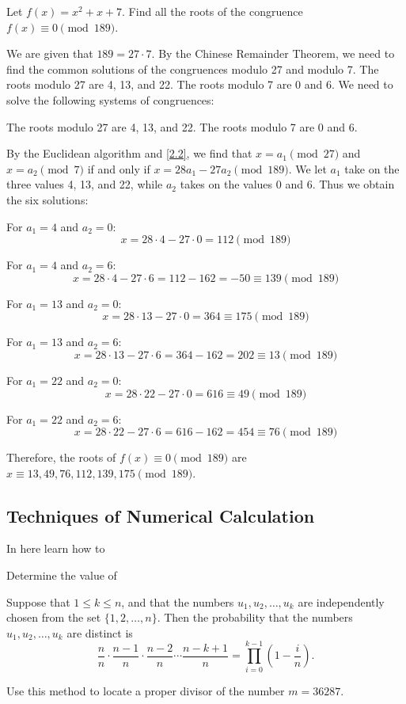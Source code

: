 \documentclass[11pt]{article}
\begin{document}
\begin{example}
	Let \( f(x) = x^2 + x + 7 \). Find all the roots of the congruence \( f(x) \equiv 0 \pmod{189} \).
\end{example}
\begin{solution}
	We are given that \(189 = 27 \cdot 7\). By the Chinese Remainder Theorem, we need to find the common solutions of the congruences modulo 27 and modulo 7. The roots modulo 27 are 4, 13, and 22. The roots modulo 7 are 0 and 6. We need to solve the following systems of congruences:

	The roots modulo 27 are 4, 13, and 22. The roots modulo 7 are 0 and 6.

	By the Euclidean algorithm and \cref{2.2}, we find that \(x = a_1 \pmod{27}\) and \(x = a_2 \pmod{7}\) if and only if \(x = 28a_1 - 27a_2 \pmod{189}\). We let \(a_1\) take on the three values 4, 13, and 22, while \(a_2\) takes on the values 0 and 6. Thus we obtain the six solutions:

	For \(a_1 = 4\) and \(a_2 = 0\):
	\[
		x = 28 \cdot 4 - 27 \cdot 0 = 112 \pmod{189}
	\]

	For \(a_1 = 4\) and \(a_2 = 6\):
	\[
		x = 28 \cdot 4 - 27 \cdot 6 = 112 - 162 = -50 \equiv 139 \pmod{189}
	\]

	For \(a_1 = 13\) and \(a_2 = 0\):
	\[
		x = 28 \cdot 13 - 27 \cdot 0 = 364 \equiv 175 \pmod{189}
	\]

	For \(a_1 = 13\) and \(a_2 = 6\):
	\[
		x = 28 \cdot 13 - 27 \cdot 6 = 364 - 162 = 202 \equiv 13 \pmod{189}
	\]

	For \(a_1 = 22\) and \(a_2 = 0\):
	\[
		x = 28 \cdot 22 - 27 \cdot 0 = 616 \equiv 49 \pmod{189}
	\]

	For \(a_1 = 22\) and \(a_2 = 6\):
	\[
		x = 28 \cdot 22 - 27 \cdot 6 = 616 - 162 = 454 \equiv 76 \pmod{189}
	\]

	Therefore, the roots of \(f(x) \equiv 0 \pmod{189}\) are \(x \equiv 13, 49, 76, 112, 139, 175 \pmod{189}\).
\end{solution}
\subsection{Techniques of Numerical Calculation}
In here learn how to
\begin{example}
	Determine the value of
\end{example}


\begin{lemma}\label{2.21}
	Suppose that \(1 \leq k \leq n\), and that the numbers \(u_1, u_2, \ldots, u_k\) are independently chosen from the set \(\{1, 2, \ldots, n\}\). Then the probability that the numbers \(u_1, u_2, \ldots, u_k\) are distinct is
	\[
		\frac{n}{n} \cdot \frac{n-1}{n} \cdot \frac{n-2}{n} \cdots \frac{n-k+1}{n} = \prod_{i=0}^{k-1} \left(1 - \frac{i}{n}\right).
	\]
\end{lemma}
\begin{example}
	Use this method to locate a proper divisor of the number \(m = 36287\).
\end{example}
\end{document}
